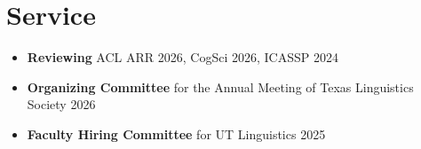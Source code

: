 \documentclass[11pt, letterpaper]{article}
\newcommand{\entry}[2]{#1 \hfill #2}
\begin{document}
\section*{Service}

\begin{itemize}
\item   \textbf{Reviewing} ACL ARR 2026, CogSci 2026, ICASSP 2024
  \item \entry{\textbf{Organizing Committee} for the Annual Meeting of Texas Linguistics Society}{2026}
  \item \entry{\textbf{Faculty Hiring Committee} for UT Linguistics}{2025}
\end{itemize}
\end{document}
